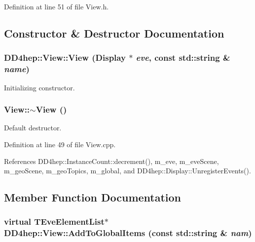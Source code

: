Definition at line 51 of file View.h.

\subsection{Constructor \& Destructor Documentation}
\hypertarget{class_d_d4hep_1_1_view_a4272d52c420ccef43e18da8915451bcd}{
\subsubsection[{View}]{\setlength{\rightskip}{0pt plus 5cm}DD4hep::View::View ({\bf Display} $\ast$ {\em eve}, \/  const std::string \& {\em name})}}
\label{class_d_d4hep_1_1_view_a4272d52c420ccef43e18da8915451bcd}


Initializing constructor. \hypertarget{class_d_d4hep_1_1_view_ad0dc854db9aabbea98a334dec89f785c}{
\subsubsection[{$\sim$View}]{\setlength{\rightskip}{0pt plus 5cm}View::$\sim$View ()}}
\label{class_d_d4hep_1_1_view_ad0dc854db9aabbea98a334dec89f785c}


Default destructor. 

Definition at line 49 of file View.cpp.

References DD4hep::InstanceCount::decrement(), m\_\-eve, m\_\-eveScene, m\_\-geoScene, m\_\-geoTopics, m\_\-global, and DD4hep::Display::UnregisterEvents().

\subsection{Member Function Documentation}
\hypertarget{class_d_d4hep_1_1_view_afd4a5a254c13a5cec6a4157cacfaabe3}{
\subsubsection[{AddToGlobalItems}]{\setlength{\rightskip}{0pt plus 5cm}virtual {\bf TEveElementList}$\ast$ DD4hep::View::AddToGlobalItems (const std::string \& {\em nam})}}
\label{class_d_d4hep_1_1_view_afd4a5a254c13a5cec6a4157cacfaabe3}


